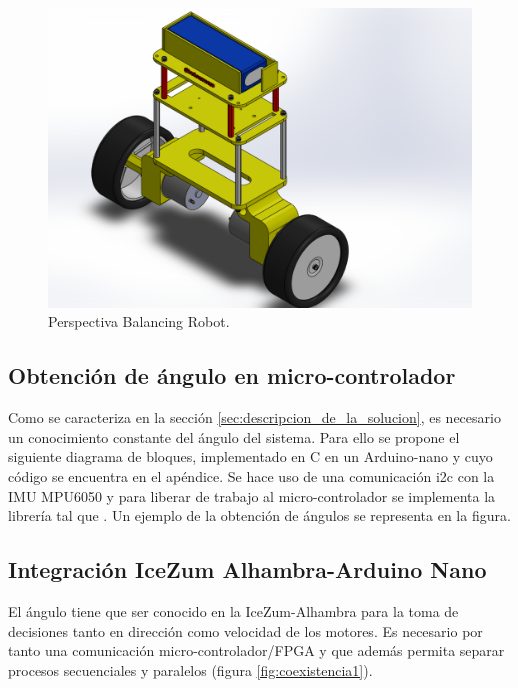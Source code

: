 \begin{center}
	\begin{figure}[H]
		\center
		\includegraphics[trim = 20mm 0mm 8cm 0mm,clip, angle=0, scale = 0.8]{imagenes/Balancing_Robot/EnsanBalanceCab.PDF}
		\caption{Perspectiva Balancing Robot.}
		\label{fig:EnsanBalanceCab}
	\end{figure}
\end{center}
\subsection{Obtención de ángulo en micro-controlador}
Como se caracteriza en la sección \ref{sec:descripcion_de_la_solucion}, es necesario un conocimiento constante del ángulo del sistema. Para ello se propone el siguiente diagrama de bloques, implementado en C en un Arduino-nano y cuyo código se encuentra en el apéndice. \newline
Se hace uso de una comunicación i2c con la IMU MPU6050 y para liberar de trabajo al micro-controlador se implementa la librería tal que .\newline
Un ejemplo de la obtención de ángulos se representa en la figura.

\subsection{Integración IceZum Alhambra-Arduino Nano}
El ángulo tiene que ser conocido en la IceZum-Alhambra para la toma de decisiones tanto en dirección como velocidad de los motores. Es necesario por tanto una comunicación micro-controlador/FPGA y que además permita separar procesos secuenciales y paralelos (figura \ref{fig:coexistencia1}).

